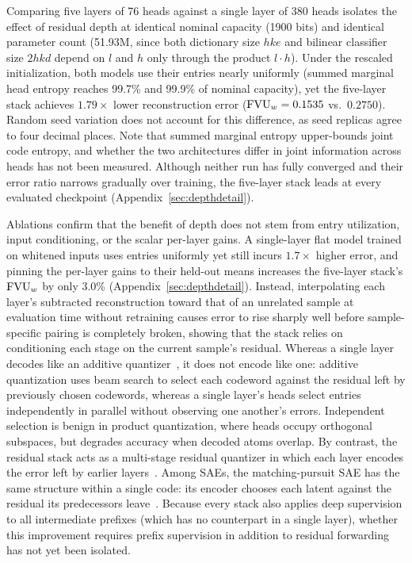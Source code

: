 Comparing five layers of 76 heads against a single layer of 380 heads
isolates the effect of residual depth at identical nominal capacity (1900
bits) and identical parameter count (51.93M, since both dictionary size
$hke$ and bilinear classifier size $2hkd$ depend on $l$ and $h$ only through
the product $l\cdot h$). Under the rescaled initialization, both models use
their entries nearly uniformly (summed marginal head entropy reaches 99.7\%
and 99.9\% of nominal capacity), yet the five-layer stack achieves
$1.79\times$ lower reconstruction error ($\mathrm{FVU}_w = 0.1535$ vs.\ $0.2750$).
Random seed variation does not account for this difference, as seed replicas
agree to four decimal places. Note that summed marginal entropy upper-bounds
joint code entropy, and whether the two architectures differ in joint
information across heads has not been measured. Although neither run has
fully converged and their error ratio narrows gradually over training, the
five-layer stack leads at every evaluated checkpoint
(Appendix~\ref{sec:depthdetail}).

Ablations confirm that the benefit of depth does not stem from entry
utilization, input conditioning, or the scalar per-layer gains. A single-layer
flat model trained on whitened inputs uses entries uniformly yet still
incurs $1.7\times$ higher error, and pinning the per-layer gains to their
held-out means increases the five-layer stack's $\mathrm{FVU}_w$ by only 3.0\%
(Appendix~\ref{sec:depthdetail}). Instead, interpolating each layer's
subtracted reconstruction toward that of an unrelated sample at evaluation
time without retraining causes error to rise sharply well before
sample-specific pairing is completely broken, showing that the stack relies
on conditioning each stage on the current sample's residual. Whereas a
single layer decodes like an additive quantizer~\cite{babenko2014}, it does
not encode like one: additive quantization uses beam search to select each
codeword against the residual left by previously chosen codewords, whereas a
single layer's heads select entries independently in parallel without
observing one another's errors. Independent selection is benign in product
quantization, where heads occupy orthogonal subspaces, but degrades
accuracy when decoded atoms overlap. By contrast, the residual stack acts as
a multi-stage residual quantizer in which each layer encodes the error left
by earlier layers~\cite{zeghidour2021}. Among SAEs, the matching-pursuit
SAE has the same structure within a single code: its encoder chooses each
latent against the residual its predecessors leave~\cite{costa2025}.
Because every stack also applies deep
supervision to all intermediate prefixes (which has no counterpart in a
single layer), whether this improvement requires prefix supervision in
addition to residual forwarding has not yet been isolated.

